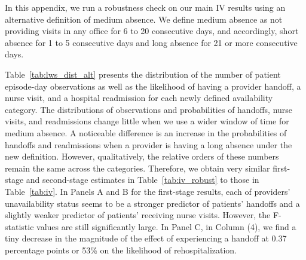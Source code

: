\documentclass[final,12pt, notitlepage]{article}
\begin{document}
\begin{singlespace}
In this appendix, we run a robustness check on our main IV results using an alternative definition of medium absence.
We define medium absence as not providing visits in any office for 6 to 20 consecutive days, and accordingly, short absence for 1 to 5 consecutive days and long absence for 21 or more consecutive days.

Table~\ref{tab:lws_dist_alt} presents the distribution of the number of patient episode-day observations as well as the likelihood of having a provider handoff, a nurse visit, and a hospital readmission for each newly defined availability category.
The distributions of observations and probabilities of handoffs, nurse visits, and readmissions change little when we use a wider window of time for medium absence.
A noticeable difference is an increase in the probabilities of handoffs and readmissions when a provider is having a long absence under the new definition.
However, qualitatively, the relative orders of these numbers remain the same across the categories.
Therefore, we obtain very similar first-stage and second-stage estimates in Table~\ref{tab:iv_robust} to those in Table~\ref{tab:iv}.
In Panels A and B for the first-stage results, each of providers' unavailability status seems to be a stronger predictor of patients' handoffs and a slightly weaker predictor of patients' receiving nurse visits.
However, the F-statistic values are still significantly large.
In Panel C, in Column (4), we find a tiny decrease in the magnitude of the effect of experiencing a handoff at 0.37 percentage points or 53\% on the likelihood of rehospitalization.



\end{singlespace}
\end{document}
